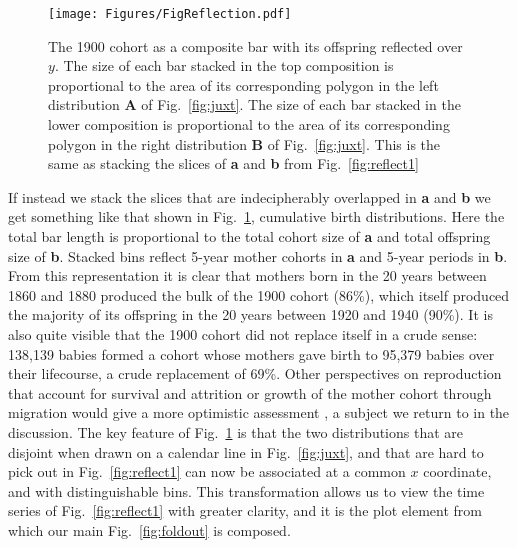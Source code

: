 \documentclass{article}
\begin{document}
\pagebreak
\begin{figure}
 \centering
        \texttt{[image: Figures/FigReflection.pdf]}
        \caption{The 1900 cohort as a composite bar with its offspring reflected over $y$. The size of each bar stacked in the top composition is proportional to the area of its corresponding polygon in the left distribution \textbf{A} of Fig.~\ref{fig:juxt}. The size of each bar stacked in the lower composition is proportional to the area of its corresponding polygon in the right distribution \textbf{B} of Fig.~\ref{fig:juxt}. This is the same as stacking the slices of \textbf{a} and \textbf{b} from Fig.~\ref{fig:reflect1} }
          \label{fig:refl}
\end{figure}
If instead we stack the slices that are indecipherably overlapped in \textbf{a} and \textbf{b} we get something like that shown in Fig.~\ref{fig:refl}, cumulative birth distributions. %
Here the total bar length is proportional to the total cohort size of \textbf{a} and total offspring size of \textbf{b}. Stacked bins reflect 5-year mother cohorts in \textbf{a} and 5-year periods in \textbf{b}. From this representation it is clear that mothers born in the 20 years between 1860 and 1880 produced the bulk of the 1900 cohort (86\%), which itself produced the majority of its offspring in the 20 years between 1920 and 1940 (90\%). It is also quite visible that the 1900 cohort did not replace itself in a crude sense: 138,139 babies formed a cohort whose mothers gave birth to 95,379 babies over their lifecourse, a crude replacement of 69\%. Other perspectives on reproduction that account for survival and attrition or growth of the mother cohort through migration would give a more optimistic assessment \citep{henry1965reflexions}, a subject we return to in the discussion. The key feature of Fig.~\ref{fig:refl} is that the two distributions that are disjoint when drawn on a calendar line in Fig.~\ref{fig:juxt}, and that are hard to pick out in Fig.~\ref{fig:reflect1} can now be associated at a common $x$ coordinate, and with distinguishable bins. This transformation allows us to view the time series of Fig.~\ref{fig:reflect1} with greater clarity, and it is the plot element from which our main Fig.~\ref{fig:foldout} is composed. 
\end{document}
